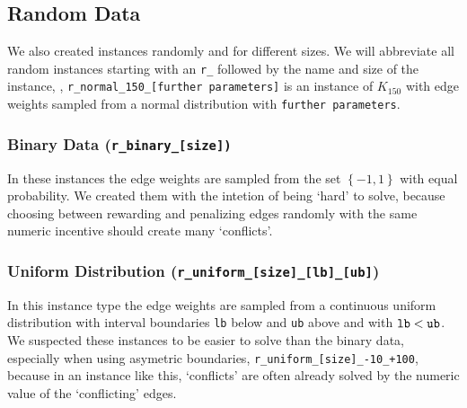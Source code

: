 \subsection{Random Data}\label{subsec:random_data}
We also created \CP instances randomly and for different sizes.
We will abbreviate all random instances starting with an \texttt{r\_} followed by the name and size of the instance,
\eg, \texttt{r\_normal\_150\_[further parameters]} is an instance of $K_{150}$ with edge weights sampled from a normal distribution with \texttt{further parameters}.

\subsubsection{Binary Data (\texttt{r\_binary\_[size])}}\label{subsubsec:data_random_binary}
In these instances the edge weights are sampled from the set $\left\{ -1, 1 \right\}$ with equal probability.
We created them with the intetion of being ‘hard’ to solve,
because choosing between rewarding and penalizing edges randomly with the same numeric incentive should create many ‘conflicts’.

\subsubsection{Uniform Distribution (\texttt{r\_uniform\_[size]\_[lb]\_[ub]})}\label{subsubsec:data_random_uniform}
In this instance type the edge weights are sampled from a continuous uniform distribution with interval boundaries \texttt{lb} below and \texttt{ub} above and with $\text{\texttt{lb}} < \text{\texttt{ub}}$.
We suspected these instances to be easier to solve than the binary data, especially when using asymetric boundaries, \eg \texttt{r\_uniform\_[size]\_-10\_+100}, because in an instance like this, ‘conflicts’ are often already solved by the numeric value of the ‘conflicting’ edges.

